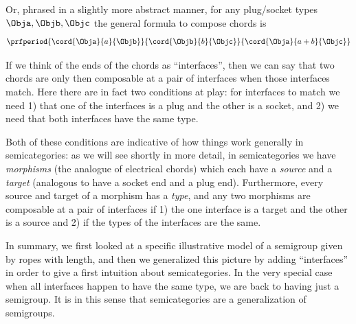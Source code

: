 Or, phrased in a slightly more abstract manner, for any plug/socket types $\Obja, \Objb, \Objc$ the general formula to compose chords is
%
\begin{equation}
    \label{eq:cords-generic}
    \prfperiod{
        \cord{\Obja}{a}{\Objb}
    }{
        \cord{\Objb}{b}{\Objc}
    }{
        \cord{\Obja}{a+b}{\Objc}
    }
\end{equation}
 
If we think of the ends of the chords as ``interfaces'', then we can say that two chords are only then composable at a pair of interfaces when those interfaces match. Here there are in fact two conditions at play: for interfaces to match we need 1) that one of the interfaces is a plug and the other is a socket, and 2) we need that both interfaces have the same type. 

Both of these conditions are indicative of how things work generally in semicategories: as we will see shortly in more detail, in semicategories we have \emph{morphisms} (the analogue of electrical chords) which each have a \emph{source} and a \emph{target} (analogous to have a socket end and a plug end). Furthermore, every source and target of a morphism has a \emph{type}, and any two morphisms are composable at a pair of interfaces if 1) the one interface is a target and the other is a source and 2) if the types of the interfaces are the same. 

In summary, we first looked at a specific illustrative model of a semigroup given by ropes with length, and then we generalized this picture by adding ``interfaces'' in order to give a first intuition about semicategories. In the very special case when all interfaces happen to have the same type, we are back to having just a semigroup. It is in this sense that semicategories are a generalization of semigroups. 



%
%
%

